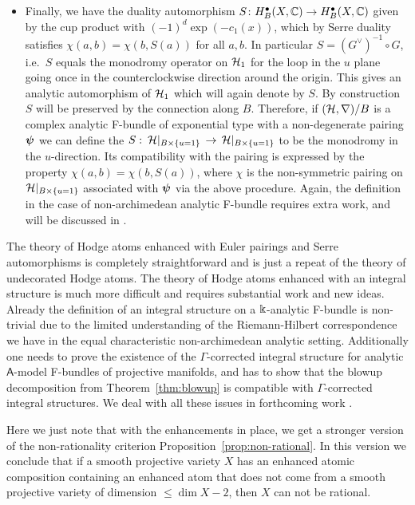 \documentclass[twoside,leqno]{article}
\numberwithin{equation}{section}
\theoremstyle{plain}
\theoremstyle{definition}
\begin{document}
\begin{itemize}[wide]
\qquad Extra work is required to carry out this comparison for the non-archimedean $\mathsf{A}$-model F-bundles, and this will be discussed in more detail in \cite{KKPY-Gamma}.
\item[(d)] Finally, we have the duality  automorphism $S \colon H^{\bullet}_{B}(X,\mathbb C) \to  H^{\bullet}_{B}(X,\mathbb C)$ given by the cup product with $(-1)^{d}\exp(-c_{1}(x))$, which by Serre duality satisfies $\chi(a,b) = \chi(b,S(a))$ for all $a, b$. In particular $S = (G^{\vee})^{-1}\circ G$, i.e.\ $S$ equals the monodromy operator on $\mathcal H_{1}$ for the loop in the $u$ plane going once in the counterclockwise direction around the origin. This gives an analytic automorphism of $\mathcal H_{1}$ which will again denote by $S$. By construction $S$ will be preserved by the connection along $B$. Therefore, if $(\mathcal H,\nabla)/B$ is a complex analytic F-bundle of exponential type with a non-degenerate pairing $\boldsymbol{\psi}$ we can define the  $S \, \colon \, \mathcal H|_{B\times \{u=1\}} \, \to \, \mathcal H|_{B\times \{u=1\}}$ to be the monodromy in the $u$-direction. Its compatibility with the pairing is expressed by the property $\chi(a,b) =\chi(b,S(a))$, where $\chi$ is the non-symmetric pairing on $\mathcal H|_{B\times \{u=1\}}$ associated with $\boldsymbol{\psi}$ via the above procedure.  Again, the definition in the case of non-archimedean analytic F-bundle requires extra work, and will be discussed in \cite{KKPY-Gamma}.
\end{itemize}

\medskip

The theory of Hodge atoms enhanced with Euler pairings and Serre automorphisms is completely straightforward and is just a repeat of the theory of undecorated Hodge atoms. The theory of Hodge atoms enhanced with an integral structure is much more difficult and requires substantial work and new ideas. Already the definition of an integral structure on a $\Bbbk$-analytic F-bundle is non-trivial due to the limited understanding of the Riemann-Hilbert correspondence  we have in the equal characteristic non-archimedean analytic setting. Additionally one needs to prove the existence of the $\Gamma$-corrected integral structure for analytic $\mathsf{A}$-model F-bundles of projective manifolds, and has to show that the blowup decomposition from Theorem~\ref{thm:blowup} is compatible with $\Gamma$-corrected integral structures. We deal with all these issues in  forthcoming work \cite{KKPY-Gamma}. 

Here we just note that with the enhancements in place, we get a stronger version of the non-rationality criterion Proposition~\ref{prop:non-rational}. In this version we conclude that if a smooth projective variety $X$ has an enhanced atomic composition containing an enhanced atom that does not come from a smooth projective variety of dimension $\leq \dim X - 2$, then $X$ can not be rational. 
\end{document}
